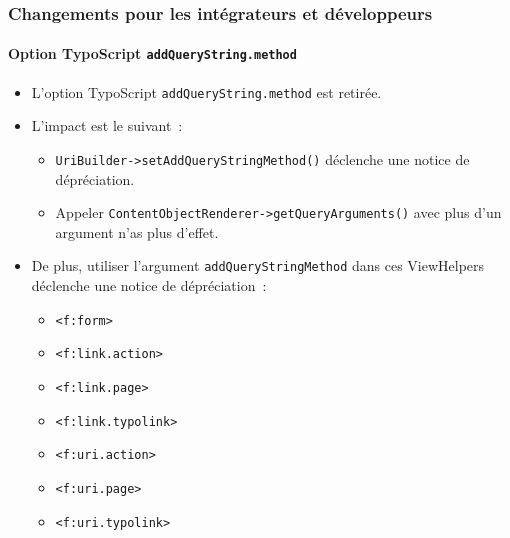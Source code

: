 %

\begin{frame}[fragile]
	\frametitle{Changements pour les intégrateurs et développeurs}
	\framesubtitle{Option TypoScript \texttt{addQueryString.method}}

	\begin{itemize}
		\item L'option TypoScript \texttt{addQueryString.method} est retirée.
		\item L'impact est le suivant~:

			\begin{itemize}\smaller
				\item \texttt{UriBuilder->setAddQueryStringMethod()} déclenche une notice de dépréciation.
				\item Appeler \texttt{ContentObjectRenderer->getQueryArguments()} avec plus d'un argument n'as plus d'effet.
			\end{itemize}\normalsize

		\item De plus, utiliser l'argument \texttt{addQueryStringMethod} dans
			ces ViewHelpers déclenche une notice de dépréciation~:

			\begin{itemize}\smaller
				\item \texttt{<f:form>}
				\item \texttt{<f:link.action>}
				\item \texttt{<f:link.page>}
				\item \texttt{<f:link.typolink>}
				\item \texttt{<f:uri.action>}
				\item \texttt{<f:uri.page>}
				\item \texttt{<f:uri.typolink>}
			\end{itemize}\normalsize

	\end{itemize}

\end{frame}

